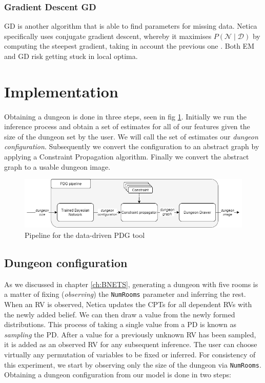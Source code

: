 \documentclass{UoYCSproject}
\begin{document}
\subsubsection{Gradient Descent GD}
GD is another algorithm that is able to find parameters for missing data. Netica specifically uses conjugate gradient descent, whereby it maximises \(P(\mathcal{N} \mid \mathcal{D})\) by computing the steepest gradient, taking in account the previous one \parencite[p47]{neticaCman}. Both EM and GD risk getting stuck in local optima.

\section{Implementation}
\label{sec:implementation}
\paragraph{}
Obtaining a dungeon is done in three steps, seen in fig \ref{fig:PDGPipeline}. Initially we run the inference process and obtain a set of estimates for all of our features given the size of the dungeon set by the user. We will call the set of estimates our \textit{dungeon configuration}. Subsequently we convert the configuration to an abstract graph by applying a Constraint Propagation algorithm. Finally we convert the abstract graph to a usable dungeon image.

\begin{figure}[htb]
  \centering
    \includegraphics[width=\textwidth]{figures/BPDG_flow.png}
    \caption{Pipeline for the data-driven PDG tool}
  \label{fig:PDGPipeline}
\end{figure}

\subsection{Dungeon configuration}
As we discussed in chapter \ref{ch:BNETS}, generating a dungeon with five rooms is a matter of fixing (\textit{observing}) the \texttt{NumRooms} parameter and inferring the rest. When an RV is observed, Netica updates the CPTs for all dependent RVs with the newly added belief. We can then draw a value from the newly formed distributions. This process of taking a single value from a PD is known as \textit{sampling} the PD. After a value for a previously unknown RV has been sampled, it is added as an observed RV for any subsequent inference. The user can choose virtually any permutation of variables to be fixed or inferred. For consistency of this experiment, we start by observing only the size of the dungeon via \texttt{NumRooms}. Obtaining a dungeon configuration from our model is done in two steps:
\end{document}
